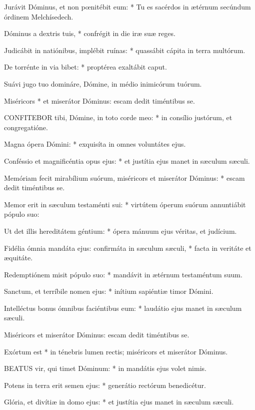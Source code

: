 Jurávit Dóminus, et non pœnitébit eum: * Tu es sacérdos in ætérnum secúndum órdinem Melchísedech.

Dóminus a dextris tuis, * confrégit in die iræ suæ reges.

Judicábit in natiónibus, implébit ruínas: * quassábit cápita in terra multórum.

De torrénte in via bibet: * proptérea exaltábit caput.

 Suávi jugo tuo domináre, Dómine, in médio inimicórum tuórum.

 Miséricors * et miserátor Dóminus: escam dedit timéntibus se.


\lettrine[lines=2]{C}{ONFITEBOR} tibi, Dómine, in toto corde meo: * in consílio justórum, et congregatióne.

Magna ópera Dómini: * exquisíta in omnes voluntátes ejus.

Conféssio et magnificéntia opus ejus: * et justítia ejus manet in sæculum sæculi.

Memóriam fecit mirabílium suórum, miséricors et miserátor Dóminus: * escam dedit timéntibus se.

Memor erit in sæculum testaménti sui: * virtútem óperum suórum annuntiábit pópulo suo:

Ut det illis hereditátem géntium: * ópera mánuum ejus véritas, et judícium.

Fidélia ómnia mandáta ejus: confirmáta in sæculum sæculi, * facta in veritáte et æquitáte.

Redemptiónem misit pópulo suo: * mandávit in ætérnum testaméntum suum.

Sanctum, et terríbile nomen ejus: * inítium sapiéntiæ timor Dómini.

Intelléctus bonus ómnibus faciéntibus eum: * laudátio ejus manet in sæculum sæculi.

 Miséricors et miserátor Dóminus: escam dedit timéntibus se.

 Exórtum est * in ténebris lumen rectis; miséricors et miserátor Dóminus.


\lettrine[lines=2]{B}{EATUS} vir, qui timet Dóminum: * in mandátis ejus volet nimis.

Potens in terra erit semen ejus: * generátio rectórum benedicétur.

Glória, et divítiæ in domo ejus: * et justítia ejus manet in sæculum sæculi.

